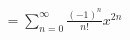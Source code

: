 \documentclass[preview]{standalone}
\begin{document}
\begin{align*}
= \sum_{n=0}^\infty \frac{(-1)^n}{n!} x^{2n}
\end{align*}
\end{document}
